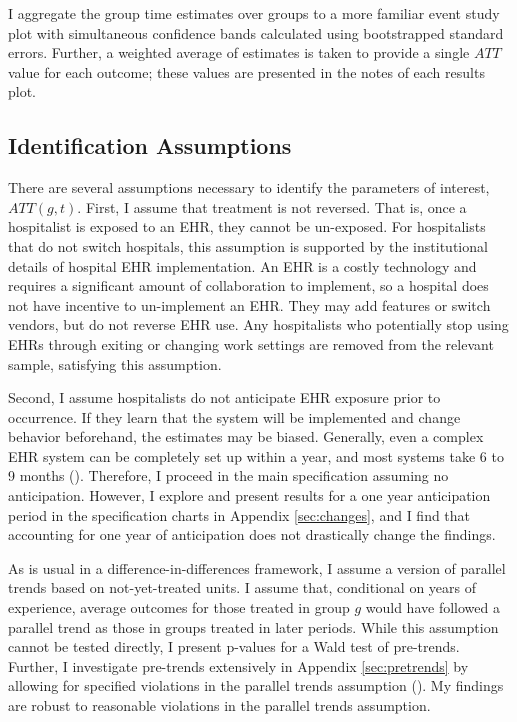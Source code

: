 \documentclass[12pt]{article}
\begin{document}
I aggregate the group time estimates over groups to a more familiar event study plot with simultaneous confidence bands calculated using bootstrapped standard errors. Further, a weighted average of estimates is taken to provide a single $ATT$ value for each outcome; these values are presented in the notes of each results plot. 

\subsection{Identification Assumptions}

There are several assumptions necessary to identify the parameters of interest, $ATT(g,t)$. First, I assume that treatment is not reversed. That is, once a hospitalist is exposed to an EHR, they cannot be un-exposed. For hospitalists that do not switch hospitals, this assumption is supported by the institutional details of hospital EHR implementation. An EHR is a costly technology and requires a significant amount of collaboration to implement, so a hospital does not have incentive to un-implement an EHR. They may add features or switch vendors, but do not reverse EHR use. Any hospitalists who potentially stop using EHRs through exiting or changing work settings are removed from the relevant sample, satisfying this assumption.

Second, I assume hospitalists do not anticipate EHR exposure prior to occurrence. If they learn that the system will be implemented and change behavior beforehand, the estimates may be biased. Generally, even a complex EHR system can be completely set up within a year, and most systems take 6 to 9 months (\cite{uzialko_2021}). Therefore, I proceed in the main specification assuming no anticipation. However, I explore and present results for a one year anticipation period in the specification charts in Appendix \ref{sec:changes}, and I find that accounting for one year of anticipation does not drastically change the findings.  

As is usual in a difference-in-differences framework, I assume a version of parallel trends based on not-yet-treated units. I assume that, conditional on years of experience, average outcomes for those treated in group $g$ would have followed a parallel trend as those in groups treated in later periods. While this assumption cannot be tested directly, I present p-values for a Wald test of pre-trends. Further, I investigate pre-trends extensively in Appendix \ref{sec:pretrends} by allowing for specified violations in the parallel trends assumption (\cite{rambachan2019honest}). My findings are robust to reasonable violations in the parallel trends assumption. 
\end{document}
